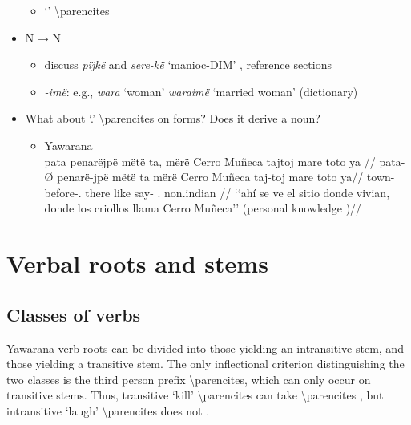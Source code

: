 \documentclass{memoir}
\begin{document}
\begin{itemize}
  \begin{itemize}
  \tightlist
  \item
     `' \textbackslash parencites
  \end{itemize}
\item
  N → N

  \begin{itemize}
  \tightlist
  \item
    discuss \emph{pïjkë} and \emph{sere-kë} `manioc-DIM' , reference
    sections
  \item
    \emph{-imë}: e.g., \emph{wara} `woman' \emph{waraimë} `married
    woman' (dictionary)
  \end{itemize}
\item
  What about  `.'
  \textbackslash parencites on  forms? Does it derive a noun?

  \begin{itemize}
  \item
    \ex  Yawarana  \\\label{histyarirdi-592}
    \begingl \glpreamble pata penarëjpë mëtë ta, mërë Cerro Muñeca tajtoj mare toto ya //
    \gla pata-Ø penarë-jpë mëtë ta mërë Cerro Muñeca taj-toj mare toto ya//
    \glb town- before-. there like   say- . non.indian //
    \glft ‘‘ahí se ve el sitio donde vivian, donde los criollos llama Cerro Muñeca’’ (personal knowledge
    )//
    \endgl
    \xe
  \end{itemize}
\end{itemize}

\chapter{\texorpdfstring{Verbal roots and stems
\label{verbderiv}}{Verbal roots and stems }}

\section{Classes of verbs}

Yawarana verb roots can be divided into those yielding an intransitive
stem, and those yielding a transitive stem. The only inflectional
criterion distinguishing the two classes is the third person prefix
 \textbackslash parencites, which can only occur on transitive
stems. Thus, transitive  `kill' \textbackslash parencites
can take  \textbackslash parencites ,
but intransitive  `laugh' \textbackslash parencites does not
.
\end{document}
